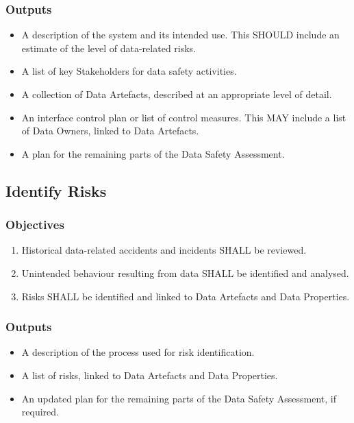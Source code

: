 \subsubsection{Outputs}
\begin{itemize}
	\item A description of the system and its intended use. This SHOULD include an estimate of the level of data-related risks.
	\item A list of key Stakeholders for data safety activities.
	\item A collection of \glspl{Data Artefact}, described at an appropriate level of detail.
	\item An interface control plan or list of control measures. This MAY include a list of Data Owners, linked to \glspl{Data Artefact}.
	\item A plan for the remaining parts of the Data Safety Assessment.
\end{itemize}

\subsection{Identify Risks}
\subsubsection{Objectives}
\begin{enumerate}[label=\color{dsiwgAccentColour}{2-\arabic*}]
	\item Historical data-related accidents and incidents SHALL be reviewed.
	\item Unintended behaviour resulting from data SHALL be identified and analysed.
	\item Risks SHALL be identified and linked to \glspl{Data Artefact} and Data Properties.
\end{enumerate}

\subsubsection{Outputs}
\begin{itemize}
	\item A description of the process used for risk identification.
	\item A list of risks, linked to \glspl{Data Artefact} and Data Properties.
	\item An updated plan for the remaining parts of the Data Safety Assessment, if required.
\end{itemize}

